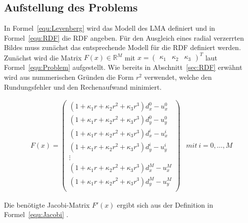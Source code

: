\subsection{Aufstellung des Problems}
\label{sec:Problem}
In Formel~\ref{equ:Levenberg} wird das Modell des LMA definiert und in Formel~\ref{equ:RDF} die RDF angeben. 
Für den Ausgleich eines radial verzerrten Bildes muss zunächst das entsprechende Modell für die RDF definiert werden. Zunächst wird die Matrix $F(x) \in \mathbb{R}^M$ mit $x = \begin{pmatrix}
\kappa_1 & \kappa_2 & \kappa_3\end{pmatrix}^T$ laut Formel~\ref{equ:Problem} aufgestellt. Wie bereits in Abschnitt~\ref{sec:RDF} erwähnt wird aus nummerischen Gründen die Form $r^2$ verwendet, welche den Rundungsfehler und den Rechenaufwand minimiert. 

\begin{equation}
\label{equ:Problem}
\begin{aligned}
&F(x)=
\begin{pmatrix}
(1+\kappa_1 r + \kappa_2 r^2 + \kappa_3 r^3)d_x^0 -u_x^0\\
(1+\kappa_1 r + \kappa_2 r^2 + \kappa_3 r^3)d_y^0 -u_y^0\\
(1+\kappa_1 r + \kappa_2 r^2 + \kappa_3 r^3)d_x^i -u_x^i\\
(1+\kappa_1 r + \kappa_2 r^2 + \kappa_3 r^3)d_y^i -u_y^i\\
\vdots\\
(1+\kappa_1 r + \kappa_2 r^2 + \kappa_3 r^3)d_x^M -u_x^M\\
(1+\kappa_1 r + \kappa_2 r^2 + \kappa_3 r^3)d_y^M -u_y^M\\
\end{pmatrix}
&mit\ i = 0,\dots,M
\end{aligned}
\end{equation}

Die benötigte Jacobi-Matrix $F'(x)$ ergibt sich aus der Definition in Formel~\ref{equ:Jacobi} .

